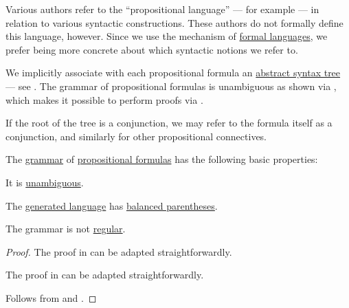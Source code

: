 \begin{comments}
  \item Various authors refer to the \enquote{propositional language} --- for example  --- in relation to various syntactic constructions. These authors do not formally define this language, however. Since we use the mechanism of \hyperref[def:formal_language]{formal languages}, we prefer being more concrete about which syntactic notions we refer to.

  \item We implicitly associate with each propositional formula an \hyperref[con:abstract_syntax_tree]{abstract syntax tree} --- see . The grammar of propositional formulas is unambiguous as shown via , which makes it possible to perform proofs via .

  \item If the root of the tree is a conjunction, we may refer to the formula itself as a conjunction, and similarly for other propositional connectives.
\end{comments}

\begin{proposition}\label{thm:propositional_formula_grammar}
  The \hyperref[def:formal_grammar]{grammar} of \hyperref[def:propositional_syntax/formula]{propositional formulas} has the following basic properties:
  \begin{thmenum}
     It is \hyperref[def:grammar_ambiguity]{unambiguous}.

     The \hyperref[def:formal_grammar/language]{generated language} has \hyperref[def:paired_delimiters]{balanced parentheses}.

     The grammar is not \hyperref[def:chomsky_hierarchy/regular]{regular}.
  \end{thmenum}
\end{proposition}
\begin{proof}
   The proof in  can be adapted straightforwardly.

   The proof in  can be adapted straightforwardly.

   Follows from  and .
\end{proof}

